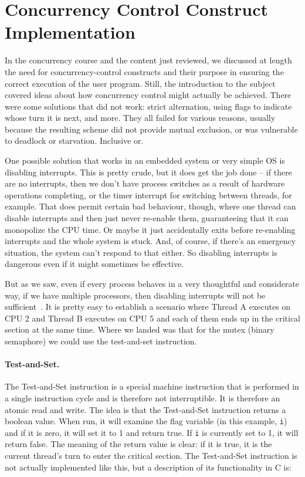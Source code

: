





\section*{Concurrency Control Construct Implementation}
In the concurrency course and the content just reviewed, we discussed at length the need for concurrency-control constructs and their purpose in ensuring the correct execution of the user program. Still, the introduction to the subject covered ideas about how concurrency control might actually be achieved. There were some solutions that did not work: strict alternation, using flags to indicate whose turn it is next, and more. They all failed for various reasons, usually because the resulting scheme did not provide mutual exclusion, or was vulnerable to deadlock or starvation. Inclusive or.

One possible solution that works in an embedded system or very simple OS is disabling interrupts. This is pretty crude, but it does get the job done -- if there are no interrupts, then we don't have process switches as a result of hardware operations completing, or the timer interrupt for switching between threads, for example. That does permit certain bad behaviour, though, where one thread can disable interrupts and then just never re-enable them, guaranteeing that it can monopolize the CPU time. Or maybe it just accidentally exits before re-enabling interrupts and the whole system is stuck. And, of course, if there's an emergency situation, the system can't respond to that either. So disabling interrupts is dangerous even if it might sometimes be effective.

But as we saw, even if every process behaves in a very thoughtful and considerate way, if we have multiple processors, then disabling interrupts will not be sufficient~\cite{osi}. It is pretty easy to establish a scenario where Thread A executes on CPU 2 and Thread B executes on CPU 5 and each of them ends up in the critical section at the same time. Where we landed was that for the mutex (binary semaphore) we could use the test-and-set instruction.

\paragraph{Test-and-Set.}
The Test-and-Set instruction is a special machine instruction that is performed in a single instruction cycle and is therefore not interruptible. It is therefore an atomic read and write. The idea is that the Test-and-Set instruction returns a boolean value. When run, it will examine the flag variable (in this example, \texttt{i}) and if it is zero, it will set it to 1 and return true. If \texttt{i} is currently set to 1, it will return false. The meaning of the return value is clear: if it is true, it is the current thread's turn to enter the critical section. The Test-and-Set instruction is not actually implemented like this, but a description of its functionality in C is:

